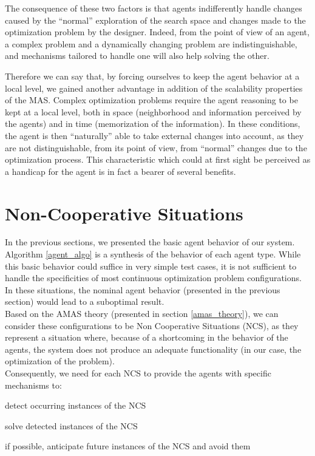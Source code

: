 The consequence of these two factors is that agents indifferently handle changes caused by the \enquote{normal} exploration of the search space and changes made to the optimization problem by the designer. Indeed, from the point of view of an agent, a complex problem and a dynamically changing problem are indistinguishable, and mechanisms tailored to handle one will also help solving the other.

Therefore we can say that, by forcing ourselves to keep the agent behavior at a local level, we gained another advantage in addition of the scalability properties of the MAS. Complex optimization problems require the agent reasoning to be kept at a local level, both in space (neighborhood and information perceived by the agents) and in time (memorization of the information). In these conditions, the agent is then \enquote{naturally} able to take external changes into account, as they are not distinguishable, from its point of view, from \enquote{normal} changes due to the optimization process. This characteristic which could at first sight be perceived as a handicap for the agent is in fact a bearer of several benefits.

\section{Non-Cooperative Situations}\label{NCS_pres}

In the previous sections, we presented the basic agent behavior of our system. Algorithm \ref{agent_algo} is a synthesis of the behavior of each agent type. While this basic behavior could suffice in very simple test cases, it is not sufficient to handle the specificities of most continuous optimization problem configurations. In these situations, the nominal agent behavior (presented in the previous section) would lead to a suboptimal result.\\
Based on the AMAS theory (presented in section \ref{amas_theory}), we can consider these configurations to be Non Cooperative Situations (NCS), as they represent a situation where, because of a shortcoming in the behavior of the agents, the system does not produce an adequate functionality (in our case, the optimization of the problem).\\
Consequently, we need for each NCS to provide the agents with specific mechanisms to:
\begin{compactenum}
\item detect occurring instances of the NCS
\item solve detected instances of the NCS
\item if possible, anticipate future instances of the NCS and avoid them
\end{compactenum}

